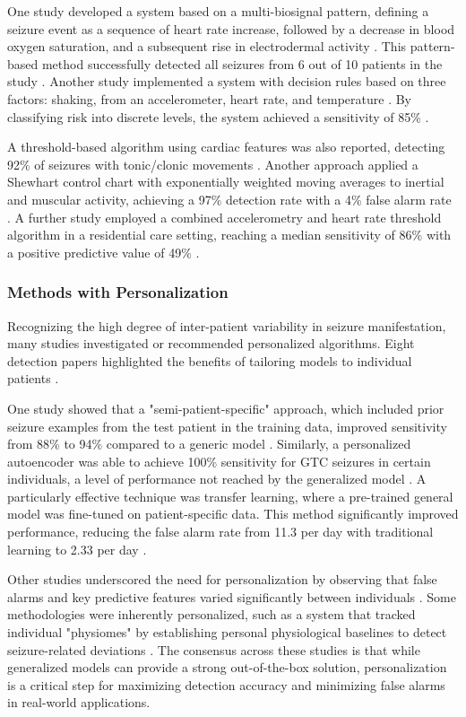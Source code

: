 One study developed a system based on a multi-biosignal pattern, defining a seizure event as a sequence of heart rate increase, followed by a decrease in blood oxygen saturation, and a subsequent rise in electrodermal activity \cite{Cogan2017-lg}. This pattern-based method successfully detected all seizures from 6 out of 10 patients in the study \cite{Cogan2017-lg}. Another study implemented a system with decision rules based on three factors: shaking, from an accelerometer, heart rate, and temperature \cite{Ali2020-ke}. By classifying risk into discrete levels, the system achieved a sensitivity of 85\% \cite{Ali2020-ke}. 

A threshold-based algorithm using cardiac features was also reported, detecting 92\% of seizures with tonic/clonic movements \cite{Hegarty-Craver2021-hk}. Another approach applied a Shewhart control chart with exponentially weighted moving averages to inertial and muscular activity, achieving a 97\% detection rate with a 4\% false alarm rate \cite{Gheryani2017-yg}. A further study employed a combined accelerometry and heart rate threshold algorithm in a residential care setting, reaching a median sensitivity of 86\% with a positive predictive value of 49\% \cite{Arends2018-ew}.


\subsubsection{Methods with Personalization}
Recognizing the high degree of inter-patient variability in seizure manifestation, many studies investigated or recommended personalized algorithms. Eight detection papers highlighted the benefits of tailoring models to individual patients \cite{Yu2023-ss, Poh2012-af, Nasseri2021-xn, Milosevic2016-ee, Hamlin2021-sd, Jiang2022-zu, Hegarty-Craver2021-hk, Wang2025-ql}.

One study showed that a "semi-patient-specific" approach, which included prior seizure examples from the test patient in the training data, improved sensitivity from 88\% to 94\% compared to a generic model \cite{Poh2012-af}. Similarly, a personalized autoencoder was able to achieve 100\% sensitivity for GTC seizures in certain individuals, a level of performance not reached by the generalized model \cite{Yu2023-ss}. A particularly effective technique was transfer learning, where a pre-trained general model was fine-tuned on patient-specific data. This method significantly improved performance, reducing the false alarm rate from 11.3 per day with traditional learning to 2.33 per day \cite{Nasseri2021-xn}.

Other studies underscored the need for personalization by observing that false alarms and key predictive features varied significantly between individuals \cite{Milosevic2016-ee, Hamlin2021-sd}. Some methodologies were inherently personalized, such as a system that tracked individual "physiomes" by establishing personal physiological baselines to detect seizure-related deviations \cite{Jiang2022-zu}. The consensus across these studies is that while generalized models can provide a strong out-of-the-box solution, personalization is a critical step for maximizing detection accuracy and minimizing false alarms in real-world applications.
